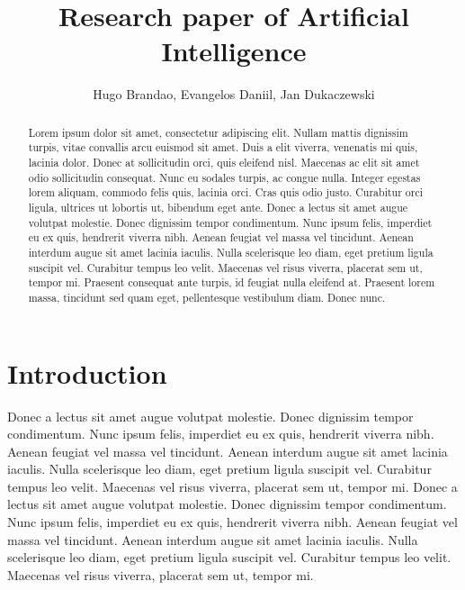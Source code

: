 \documentclass{article}
\begin{document}
\title{Research paper of Artificial Intelligence}
\author{Hugo Brandao, Evangelos Daniil, Jan Dukaczewski}

\maketitle

\begin{abstract} 
Lorem ipsum dolor sit amet, consectetur adipiscing elit. Nullam mattis dignissim turpis, vitae convallis arcu
euismod sit amet. Duis a elit viverra, venenatis mi quis, lacinia dolor. Donec at sollicitudin orci, quis eleifend
nisl. Maecenas ac elit sit amet odio sollicitudin consequat. Nunc eu sodales turpis, ac congue nulla. Integer
egestas lorem aliquam, commodo felis quis, lacinia orci. Cras quis odio justo. Curabitur orci ligula, ultrices ut
lobortis ut, bibendum eget ante.
\vspace{5mm}
\newline
Donec a lectus sit amet augue volutpat molestie. Donec dignissim tempor condimentum. Nunc ipsum felis, imperdiet
eu ex quis, hendrerit viverra nibh. Aenean feugiat vel massa vel tincidunt. Aenean interdum augue sit amet lacinia
iaculis. Nulla scelerisque leo diam, eget pretium ligula suscipit vel. Curabitur tempus leo velit. Maecenas vel
risus viverra, placerat sem ut, tempor mi.
\vspace{5mm}
\newline
Praesent consequat ante turpis, id feugiat nulla eleifend at. Praesent lorem massa, tincidunt sed quam eget,
pellentesque vestibulum diam. Donec nunc.
\end{abstract}

\section{Introduction}
Donec a lectus sit amet augue volutpat molestie. Donec dignissim tempor condimentum. Nunc ipsum felis, imperdiet
eu ex quis, hendrerit viverra nibh. Aenean feugiat vel massa vel tincidunt. Aenean interdum augue sit amet lacinia
iaculis. Nulla scelerisque leo diam, eget pretium ligula suscipit vel. Curabitur tempus leo velit. Maecenas vel
risus viverra, placerat sem ut, tempor mi.
\vspace{5mm}
\newline
Donec a lectus sit amet augue volutpat molestie. Donec dignissim tempor condimentum. Nunc ipsum felis, imperdiet
eu ex quis, hendrerit viverra nibh. Aenean feugiat vel massa vel tincidunt. Aenean interdum augue sit amet lacinia
iaculis. Nulla scelerisque leo diam, eget pretium ligula suscipit vel. Curabitur tempus leo velit. Maecenas vel
risus viverra, placerat sem ut, tempor mi.
\end{document}
